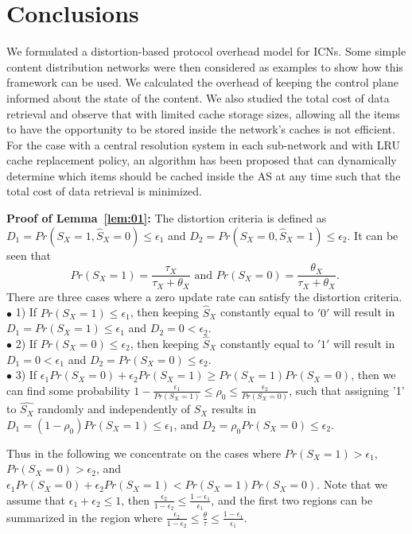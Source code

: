 \documentclass[conference]{IEEEtran}
\theoremstyle{plain}
\theoremstyle{remark}
\begin{document}
\section{Conclusions}
\label{sec:conclusion}

We formulated a distortion-based protocol overhead model for ICNs. Some simple content distribution networks were then considered as examples to show how this framework can be used. We calculated the overhead of keeping the control plane informed about the state of the content. We also studied the total cost of data retrieval and observe that with limited cache storage sizes, allowing all the items to have the opportunity to be stored inside the network's caches is not efficient. For the case with a central resolution system in each sub-network and with LRU cache replacement policy, an algorithm has been proposed that can dynamically determine which items should be cached inside the AS at any time such that the total cost of data retrieval is minimized.




\appendix
{\textbf{Proof of Lemma~\ref{lem:01}: }}The distortion criteria is defined as $D_1 = Pr(S_X=1,\hat{S}_X=0) \leq \epsilon_1$ and $D_2 = Pr(S_X=0,\hat{S}_X=1) \leq \epsilon_2$. It can be seen that
\begin{equation}
Pr(S_X=1)=\frac{\tau_X}{\tau_X+\theta_X} \mbox{ and }Pr(S_X=0)=\frac{\theta_X}{\tau_X+\theta_X} \mbox{.   }\nonumber
\end{equation}
There are three cases where a zero update rate can satisfy the distortion criteria.\\
$\bullet$ 1) If $Pr(S_X=1)\leq \epsilon_1$, then keeping $\hat{S}_X$ constantly equal to $'0'$ will result in $D_1=Pr(S_X=1)\leq \epsilon_1$ and $D_2=0<\epsilon_2$.\\
$\bullet$ 2) If $Pr(S_X=0)\leq \epsilon_2$, then keeping $\hat{S}_X$ constantly equal to $'1'$ will result in $D_1=0< \epsilon_1$ and $D_2=Pr(S_X=0)\leq \epsilon_2$.\\
$\bullet$ 3) If $\epsilon_1 Pr(S_X=0)+\epsilon_2 Pr(S_X=1) \geq Pr(S_X=1)Pr(S_X=0) $, then we can find some probability $1-\frac{\epsilon_1}{Pr(S_X=1)} \leq \rho_0 \leq \frac{\epsilon_2}{Pr(S_X=0)}$, such that assigning '1' to $\hat{S_X}$ randomly  and independently of $S_X$ results in $D_1=(1-\rho_0)Pr(S_X=1)\leq \epsilon_1$, and $D_2=\rho_0Pr(S_X=0) \leq \epsilon_2$.

Thus in the following we concentrate on the cases where $Pr(S_X=1)>\epsilon_1$, $Pr(S_X=0)>\epsilon_2$, and $\epsilon_1 Pr(S_X=0)+\epsilon_2 Pr(S_X=1) < Pr(S_X=1)Pr(S_X=0) $. Note that we assume that $\epsilon_1+\epsilon_2\leq 1$, then $\frac{\epsilon_2}{1-\epsilon_2}\leq \frac{1-\epsilon_1}{\epsilon_1}$, and the first two regions can be summarized in the region where $\frac{\epsilon_2}{1-\epsilon_2}\leq \frac{\theta}{\tau} \leq \frac{1-\epsilon_1}{\epsilon_1}$.
\end{document}

